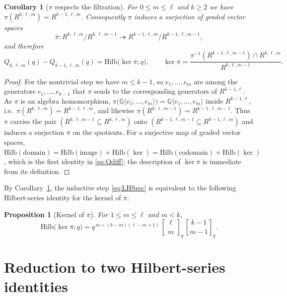 \documentclass{amsart}
\newtheorem{proposition}{Proposition}
\newtheorem{corollary}{Corollary}
\theoremstyle{definition}
\newcommand{\Hilb}{\mathrm{Hilb}}
\newcommand{\qbin}[2]{\genfrac{[}{]}{0pt}{}{#1}{#2}_q}
\newcommand{\Q}{\mathbb{Q}}
\newcommand{\Rklm}{R^{k,\ell,m}}
\begin{document}
\begin{corollary}[$\pi$ respects the filtration]\label{cor:pifiltr}
For $0\le m\le \ell$ and $k\ge2$ we have $\pi(\Rklm)=R^{k-1,\ell,m}$. Consequently
$\pi$ induces a surjection of graded vector spaces
\[
\overline{\pi}\colon \Rklm/R^{k,\ell,m-1}\twoheadrightarrow
R^{k-1,\ell,m}/R^{k-1,\ell,m-1},
\]
and therefore
\begin{equation}\label{eq:Qdiff}
Q_{k,\ell,m}(q)-Q_{k-1,\ell,m}(q)=\Hilb\big(\ker\overline{\pi};q\big),
\qquad
\ker\overline{\pi}=\frac{\pi^{-1}(R^{k-1,\ell,m-1})\cap \Rklm}{R^{k,\ell,m-1}} .
\end{equation}
\end{corollary}

\begin{proof}
For the nontrivial step we have $m\le k-1$, so $e_1,\dots,e_m$ are among the
generators $e_1,\dots,e_{k-1}$ that $\pi$ sends to the corresponding generators of
$R^{k-1,\ell}$. As $\pi$ is an algebra homomorphism,
$\pi\big(\Q\langle e_1,\dots,e_m\rangle\big)=\Q\langle e_1,\dots,e_m\rangle$ inside
$R^{k-1,\ell}$, i.e.\ $\pi(\Rklm)=R^{k-1,\ell,m}$, and likewise
$\pi(R^{k,\ell,m-1})=R^{k-1,\ell,m-1}$. Thus $\pi$ carries the pair
$(R^{k,\ell,m-1}\subseteq\Rklm)$ onto $(R^{k-1,\ell,m-1}\subseteq R^{k-1,\ell,m})$
and induces a surjection $\overline{\pi}$ on the quotients. For a surjective map of
graded vector spaces, $\Hilb(\text{domain})=\Hilb(\text{image})+\Hilb(\ker)
=\Hilb(\text{codomain})+\Hilb(\ker)$, which is the first identity in \eqref{eq:Qdiff};
the description of $\ker\overline\pi$ is immediate from its definition.
\end{proof}

By Corollary~\ref{cor:pifiltr}, the inductive step \eqref{eq:LHSrec} is equivalent
to the following Hilbert-series identity for the kernel of $\overline\pi$.

\begin{proposition}[Kernel of $\overline\pi$]\label{prop:kernel}
For $1\le m\le\ell$ and $m<k$,
\begin{equation}\label{eq:kernelHilb}
\Hilb\big(\ker\overline\pi;q\big)
= q^{\,m+(k-m)(\ell-m+1)}\,\qbin{\ell}{m}\,\qbin{k-1}{m-1}.
\end{equation}
\end{proposition}

\section{Reduction to two Hilbert-series identities}
\end{document}
